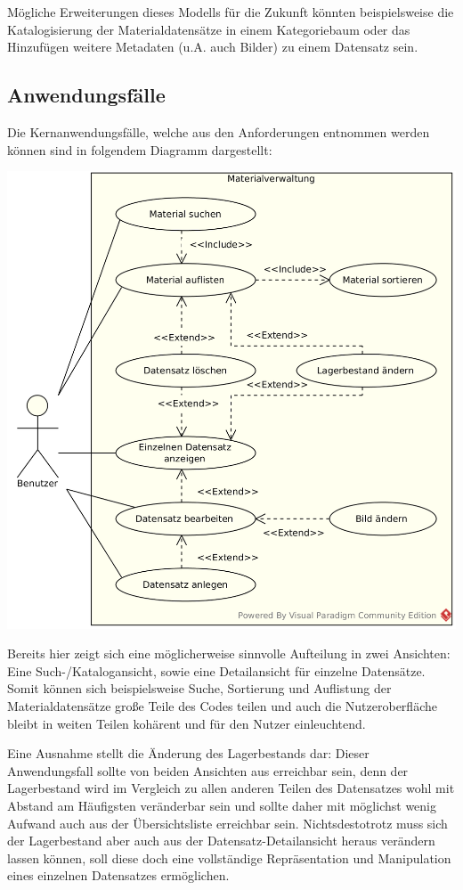 Mögliche Erweiterungen dieses Modells für die Zukunft könnten beispielsweise die Katalogisierung der Materialdatensätze
in einem Kategoriebaum oder das Hinzufügen weitere Metadaten (u.A. auch Bilder) zu einem Datensatz sein.

\newpage
\subsection{Anwendungsfälle}
Die Kernanwendungsfälle, welche aus den Anforderungen entnommen werden können sind in folgendem Diagramm dargestellt:

\begin{center}
\noindent\includegraphics[width=150mm,keepaspectratio]{images/02-anwendungsfaelle.png}
\end{center}

Bereits hier zeigt sich eine möglicherweise sinnvolle Aufteilung in zwei Ansichten: Eine Such-/Katalogansicht,
sowie eine Detailansicht für einzelne Datensätze. Somit können sich beispielsweise Suche, Sortierung und Auflistung der
Materialdatensätze große Teile des Codes teilen und auch die Nutzeroberfläche bleibt in weiten Teilen kohärent und
für den Nutzer einleuchtend.

Eine Ausnahme stellt die Änderung des Lagerbestands dar: Dieser Anwendungsfall sollte von
beiden Ansichten aus erreichbar sein, denn der Lagerbestand wird im Vergleich zu allen anderen Teilen des Datensatzes
wohl mit Abstand am Häufigsten veränderbar sein und sollte daher mit möglichst wenig Aufwand auch aus der Übersichtsliste
erreichbar sein. Nichtsdestotrotz muss sich der Lagerbestand aber auch aus der Datensatz-Detailansicht heraus verändern
lassen können, soll diese doch eine vollständige Repräsentation und Manipulation eines einzelnen Datensatzes ermöglichen.

